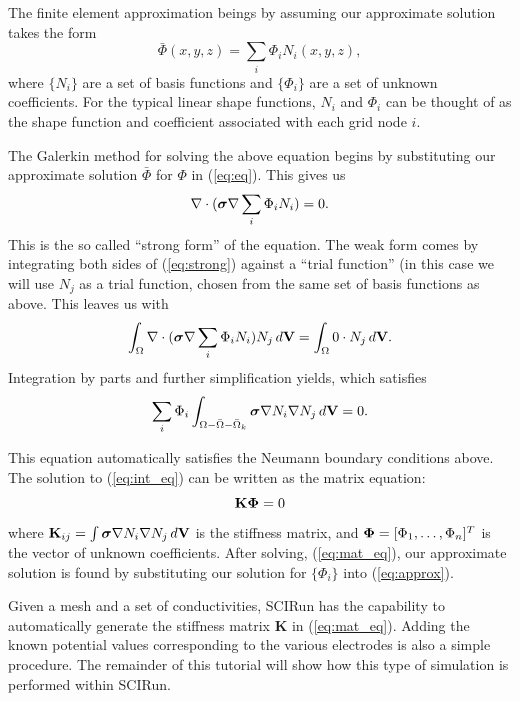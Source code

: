 \documentclass[fleqn,11pt,openany]{book}
\newcommand{\BM }[1]{\mbox{\boldmath $#1$}}
\begin{document}
The finite element approximation beings by assuming our approximate
solution takes the form
\begin{equation} \bar{\Phi}(x,y,z) = \sum_i \Phi_i
N_i(x,y,z), \label{eq:approx}
\end{equation} where $\{N_i\}$ are a set of basis functions and
$\{\Phi_i\}$ are a set of unknown coefficients. For the typical linear
shape functions, $N_i$ and $\Phi_i$ can be thought of as the shape
function and coefficient associated with each grid node $i$.

The Galerkin method for solving the above equation begins by
substituting our approximate solution $\bar{\Phi}$ for $\Phi$ in
(\ref{eq:eq}). This gives us
\begin{equation} \nabla \cdot (\BM{\sigma} \nabla \sum_i \Phi_i N_i) =
0. \label{eq:strong}
\end{equation}
%
This is the so called ``strong form'' of the equation. The weak form
comes by integrating both sides of (\ref{eq:strong}) against a ``trial
function'' (in this case we will use $N_j$ as a trial function, chosen
from the same set of basis functions as above. This leaves us with
\begin{equation} \int_\Omega \nabla \cdot (\BM{\sigma} \nabla \sum_i
\Phi_i N_i)N_j \, d\mathbf{V} = \int_\Omega 0 \cdot N_j \,
d\mathbf{V}.
\end{equation}
%
Integration by parts and further simplification yields, which
satisfies
\begin{equation} \sum_i \Phi_i \int_{\Omega - \bar{\Omega} -
\bar{\Omega}_k} \BM{\sigma} \nabla N_i \nabla N_j \, d\mathbf{V} =
0. \label{eq:int_eq}
\end{equation}

This equation automatically satisfies the Neumann boundary conditions
above. The solution to (\ref{eq:int_eq}) can be written as the matrix
equation:
\begin{equation} \mathbf{K} \BM{\Phi} = 0 \label{eq:mat_eq}
\end{equation}
%
where $\mathbf{K}_{ij} = \int \BM{\sigma} \nabla N_i \nabla N_j \,
d\mathbf{V}$ is the stiffness matrix, and $\BM{\Phi} = [\Phi_1,
\ldots, \Phi_n]^T$ is the vector of unknown coefficients. After
solving, (\ref{eq:mat_eq}), our approximate solution is found by
substituting our solution for $\{\Phi_i\}$ into (\ref{eq:approx}).

Given a mesh and a set of conductivities, SCIRun has the capability to
automatically generate the stiffness matrix $\mathbf{K}$ in
(\ref{eq:mat_eq}). Adding the known potential values corresponding to
the various electrodes is also a simple procedure. The remainder of
this tutorial will show how this type of simulation is performed
within SCIRun.
\end{document}

